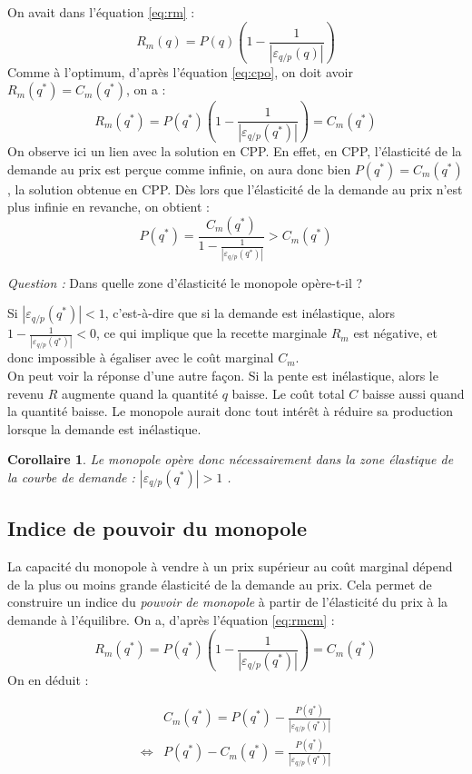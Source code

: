 \documentclass[
  a4paper,
]{book}
\newtheorem{corollary}{Corollaire}[chapter]
\theoremstyle{definition}
\theoremstyle{definition}
\theoremstyle{definition}
\theoremstyle{definition}
\theoremstyle{remark}
\begin{document}
On avait dans l'équation \eqref{eq:rm} :
\[
R_m(q) = P(q)\left(1 - \frac{1}{|\varepsilon_{q/p}(q)|}\right)
\]
Comme à l'optimum, d'après l'équation \eqref{eq:cpo}, on doit avoir \(R_m(q^*)=C_m(q^*)\), on a :
\[
R_m(q^*) = P(q^*)\left(1 - \frac{1}{|\varepsilon_{q/p}(q^*)|}\right) = C_m(q^*) 
\label{eq:rmcm}
\]
On observe ici un lien avec la solution en CPP.
En effet, en CPP, l'élasticité de la demande au prix est perçue comme infinie, on aura donc bien \(P(q^*) = C_m(q^*)\), la solution obtenue en CPP.
Dès lors que l'élasticité de la demande au prix n'est plus infinie en revanche, on obtient :
\[
 P(q^*)=\frac{C_m(q^*)}{1 - \frac{1}{\left|\varepsilon_{q/p}(q^*)\right|}} > C_m(q^*)
\]

\emph{Question :} Dans quelle zone d'élasticité le monopole opère-t-il ?

Si \(\left|\varepsilon_{q/p}(q^*)\right|<1\), c'est-à-dire que si la demande est inélastique, alors \(1 - \frac{1}{\left|\varepsilon_{q/p}(q^*)\right|} <0\), ce qui implique que la recette marginale \(R_m\) est négative, et donc impossible à égaliser avec le coût marginal \(C_m\).\\
On peut voir la réponse d'une autre façon.
Si la pente est inélastique, alors le revenu \(R\) augmente quand la quantité \(q\) baisse.
Le coût total \(C\) baisse aussi quand la quantité baisse.
Le monopole aurait donc tout intérêt à réduire sa production lorsque la demande est inélastique.

\begin{corollary}
Le monopole opère donc nécessairement dans la zone élastique de la courbe de demande : \(\left|\varepsilon_{q/p}(q^*)\right|>1\) .
\end{corollary}

\hypertarget{indice-de-pouvoir-du-monopole}{%
\subsection{Indice de pouvoir du monopole}\label{indice-de-pouvoir-du-monopole}}

La capacité du monopole à vendre à un prix supérieur au coût marginal dépend de la plus ou moins grande élasticité de la demande au prix.
Cela permet de construire un indice du \emph{pouvoir de monopole} à partir de l'élasticité du prix à la demande à l'équilibre.
On a, d'après l'équation \eqref{eq:rmcm} :
\[
R_m(q^*) = P(q^*)\left(1 - \frac{1}{|\varepsilon_{q/p}(q^*)|}\right) = C_m(q^*) 
\]
On en déduit :

\[\begin{array}{rl}
& C_m(q^*) = P(q^*) - \frac{P(q^*)}{|\varepsilon_{q/p}(q^*)|}\\
\Leftrightarrow & P(q^*) - C_m(q^*) = \frac{P(q^*)}{|\varepsilon_{q/p}(q^*)|}
\end{array}
\]
\end{document}
